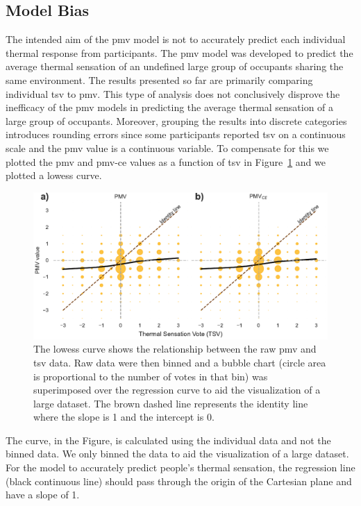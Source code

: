 \subsection{Model Bias}\label{subsec:model-bias}
The intended aim of the \ac{pmv} model is not to accurately predict each individual thermal response from participants.
The \ac{pmv} model was developed to predict the average thermal sensation of an undefined large group of occupants sharing the same environment.
The results presented so far are primarily comparing individual \ac{tsv} to \ac{pmv}.
This type of analysis does not conclusively disprove the inefficacy of the \ac{pmv} models in predicting the average thermal sensation of a large group of occupants.
Moreover, grouping the results into discrete categories introduces rounding errors since some participants reported \ac{tsv} on a continuous scale and the \ac{pmv} value is a continuous variable.
To compensate for this we plotted the \ac{pmv} and \ac{pmv-ce} values as a function of \ac{tsv} in Figure~\ref{fig:bubble_models_vs_tsv} and we plotted a \ac{lowess} curve.
\begin{figure}[htb!]
    \centering
    \includegraphics[width=\textwidth]{figures/bubble_models_vs_tsv}
    \caption{The \ac{lowess} curve shows the relationship between the raw \ac{pmv} and \ac{tsv} data.
    Raw data were then binned and a bubble chart (circle area is proportional to the number of votes in that bin) was superimposed over the regression curve to aid the visualization of a large dataset.
    The brown dashed line represents the identity line where the slope is 1 and the intercept is 0.}
    \label{fig:bubble_models_vs_tsv}
\end{figure}
The curve, in the Figure, is calculated using the individual data and not the binned data.
We only binned the data to aid the visualization of a large dataset.
For the model to accurately predict people’s thermal sensation, the regression line (black continuous line) should pass through the origin of the Cartesian plane and have a slope of 1.
